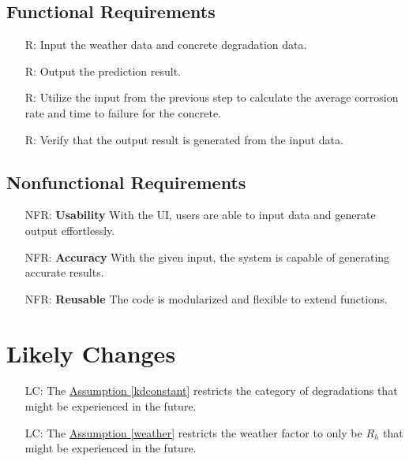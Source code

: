 \documentclass[12pt]{article}
\newcounter{reqnum} %
\newcounter{nfrnum} %
\newcounter{lcnum} %
\begin{document}
\subsection{Functional Requirements}

\noindent \begin{itemize}

\item[R\refstepcounter{reqnum}\thereqnum \label{R_Inputs}:] Input the weather data and concrete degradation data.

\item[R\refstepcounter{reqnum}\thereqnum \label{R_Output}:] Output the prediction result.

\item[R\refstepcounter{reqnum}\thereqnum \label{R_Calculate}:] Utilize the input from the previous step to calculate the average corrosion rate and time to failure for the concrete.

\item[R\refstepcounter{reqnum}\thereqnum \label{R_VerifyOutput}:]Verify that the output result is generated from the input data.
\end{itemize}

\subsection{Nonfunctional Requirements}

\noindent \begin{itemize}

\item[NFR\refstepcounter{nfrnum}\thenfrnum \label{NFR_Usability}:]
  \textbf{Usability} With the UI, users are able to input data and generate output effortlessly.

\item[NFR\refstepcounter{nfrnum}\thenfrnum \label{NFR_Accuracy}:]
  \textbf{Accuracy} With the given input, the system is capable of generating accurate results.

\item[NFR\refstepcounter{nfrnum}\thenfrnum \label{NFR_Reusable}:] \textbf{Reusable} The code is modularized and flexible to extend functions.
\end{itemize}

\section{Likely Changes}    

\noindent 
\begin{itemize}

\item[LC\refstepcounter{lcnum}\thelcnum\label{LC_meaningfulLabel}:] The \hyperref[kdconstant]{Assumption \ref*{kdconstant}} restricts the category of degradations that might be experienced in the future.

\item[LC\refstepcounter{lcnum}\thelcnum\label{LC_meaningfulLabe2}:] The \hyperref[weather]{Assumption \ref*{weather}} restricts the weather factor to only be \(R_h\) that might be experienced in the future.
\end{itemize}
\end{document}
